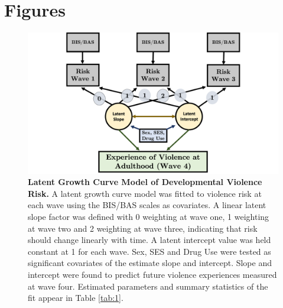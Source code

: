 \documentclass[utf8]{article}
\begin{document}
\section*{Figures}
\begin{figure}[h!]
\includegraphics[width=\textwidth,height=\textheight,keepaspectratio]{Fig-1}
\caption{\textbf{Latent Growth Curve Model of Developmental Violence Risk.} A latent growth curve model was fitted to violence risk at each wave using the BIS/BAS scales as covariates. A linear latent slope factor was defined with 0 weighting at wave one, 1 weighting at wave two and 2 weighting at wave three, indicating that risk should change linearly with time. A latent intercept value was held constant at 1 for each wave. Sex, SES and Drug Use were tested as significant covariates of the estimate slope and intercept. Slope and intercept were found to predict future violence experiences measured at wave four. Estimated parameters and summary statistics of the fit appear in Table \ref{tab:1}. \label{fig:1}}
\end{figure}
%
\end{document}
